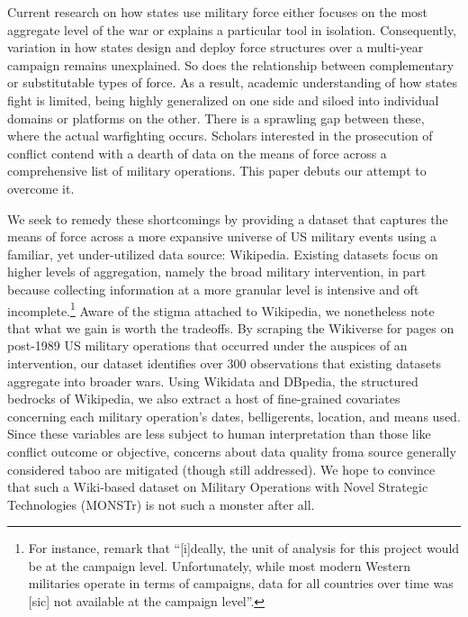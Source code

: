 \documentclass[fleqn,12pt]{article}
\begin{document}
Current research on how states use military force either focuses on the most aggregate level of the war or explains a particular tool in isolation. Consequently, variation in how states design and deploy force structures over a multi-year campaign remains unexplained. So does the relationship between complementary or substitutable types of force. As a result, academic understanding of how states fight is limited, being highly generalized on one side and siloed into individual domains or platforms on the other. There is a sprawling gap between these, where the actual warfighting occurs. Scholars interested in the prosecution of conflict contend with a dearth of data on the means of force across a comprehensive list of military operations. This paper debuts our attempt to overcome it.

We seek to remedy these shortcomings by providing a dataset that captures the means of force across a more expansive universe of US military events using a familiar, yet under-utilized data source: Wikipedia. Existing datasets focus on higher levels of aggregation, namely the broad military intervention, in part because collecting information at a more granular level is intensive and oft incomplete.\footnote{For instance, \citet[549]{allen_understandingimpactair_2019} remark that ``[i]deally, the unit of analysis for this project would be at the campaign level. Unfortunately, while most modern Western militaries operate in terms of campaigns, data for all countries over time was [sic] not available at the campaign level”.} Aware of the stigma attached to Wikipedia, we nonetheless note that what we gain is worth the tradeoffs. By scraping the Wikiverse for pages on post-1989 US military operations that occurred under the auspices of an intervention, our dataset identifies over 300 observations that existing datasets aggregate into broader wars. Using Wikidata and DBpedia, the structured bedrocks of Wikipedia, we also extract a host of fine-grained covariates concerning each military operation's dates, belligerents, location, and means used. Since these variables are less subject to human interpretation than those like conflict outcome or objective, concerns about data quality froma  source generally considered taboo are mitigated (though still addressed). We hope to convince that such a Wiki-based dataset on Military Operations with Novel Strategic Technologies (MONSTr) is not such a monster after all.
\end{document}

